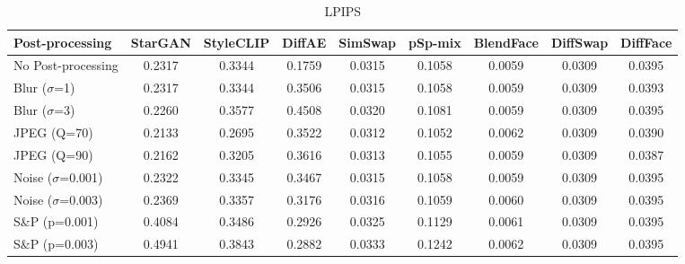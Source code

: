 \documentclass{article}
\begin{document}
\begin{table}[h!]
\begin{subtable}{\textwidth}
\caption{LPIPS}
\centering
\scriptsize
\begin{tabular}{lcccccccc}
\toprule
\textbf{Post-processing} & StarGAN & StyleCLIP & DiffAE & SimSwap & pSp-mix & BlendFace & DiffSwap & DiffFace \\
\midrule
No Post-processing & 0.2317 & 0.3344 & 0.1759 & 0.0315 & 0.1058 & 0.0059 & 0.0309 & 0.0395 \\
\midrule
Blur ($\sigma$=1) & 0.2317 & 0.3344 & 0.3506 & 0.0315 & 0.1058 & 0.0059 & 0.0309 & 0.0393 \\
Blur ($\sigma$=3) & 0.2260 & 0.3577 & 0.4508 & 0.0320 & 0.1081 & 0.0059 & 0.0309 & 0.0395 \\
JPEG (Q=70) & 0.2133 & 0.2695 & 0.3522 & 0.0312 & 0.1052 & 0.0062 & 0.0309 & 0.0390 \\
JPEG (Q=90) & 0.2162 & 0.3205 & 0.3616 & 0.0313 & 0.1055 & 0.0059 & 0.0309 & 0.0387 \\
Noise ($\sigma$=0.001) & 0.2322 & 0.3345 & 0.3467 & 0.0315 & 0.1058 & 0.0059 & 0.0309 & 0.0395 \\
Noise ($\sigma$=0.003) & 0.2369 & 0.3357 & 0.3176 & 0.0316 & 0.1059 & 0.0060 & 0.0309 & 0.0395 \\
S\&P (p=0.001) & 0.4084 & 0.3486 & 0.2926 & 0.0325 & 0.1129 & 0.0061 & 0.0309 & 0.0395 \\
S\&P (p=0.003) & 0.4941 & 0.3843 & 0.2882 & 0.0333 & 0.1242 & 0.0062 & 0.0309 & 0.0395 \\
\bottomrule
\end{tabular}
\end{subtable}


\end{table}
\end{document}
